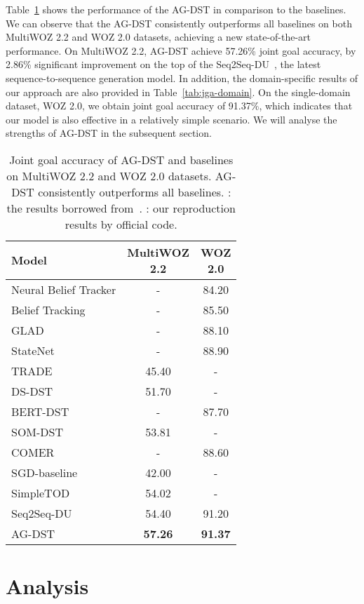 \documentclass[11pt]{article}
\begin{document}
Table~\ref{tab:jga-baselines} shows the performance of the AG-DST in comparison to the baselines. We can observe that the AG-DST consistently outperforms all baselines on both MultiWOZ 2.2 and WOZ 2.0 datasets, achieving a new state-of-the-art performance. On MultiWOZ 2.2, AG-DST achieve 57.26\% joint goal accuracy, by 2.86\% significant improvement on the top of the Seq2Seq-DU~\citep{feng-etal-2021-sequence}, the latest sequence-to-sequence generation model. In addition, the domain-specific results of our approach are also provided in Table~\ref{tab:jga-domain}. 
On the single-domain dataset, WOZ 2.0, we obtain joint goal accuracy of 91.37\%, which indicates that our model is also effective in a relatively simple scenario. We will analyse the strengths of AG-DST in the subsequent section.

\begin{table}
\centering
\begin{tabular}{lcc}
\hline
\textbf{Model} & \makecell[c]{\textbf{MultiWOZ} \\ \textbf{2.2}} & \makecell[c]{\textbf{WOZ} \\ \textbf{2.0}} \\
\hline
\hline
Neural Belief Tracker & - & 84.20 \\
Belief Tracking & - & 85.50 \\
GLAD & - & 88.10 \\
StateNet & - & 88.90 \\
TRADE & 45.40 & - \\
DS-DST & 51.70 & - \\
BERT-DST & - & 87.70 \\
SOM-DST & 53.81 & - \\
COMER & - & 88.60 \\
SGD-baseline & 42.00 & - \\
SimpleTOD & 54.02 & - \\
Seq2Seq-DU & 54.40 & 91.20 \\
\hline
AG-DST & \textbf{57.26} & \textbf{91.37} \\
\hline
\end{tabular}
\caption{Joint goal accuracy of AG-DST and baselines on MultiWOZ 2.2 and WOZ 2.0 datasets. AG-DST consistently outperforms all baselines. : the results borrowed from~\citet{zang-etal-2020-multiwoz}. : our reproduction results by official code.}\label{tab:jga-baselines}
\end{table}

\section{Analysis}
\end{document}

